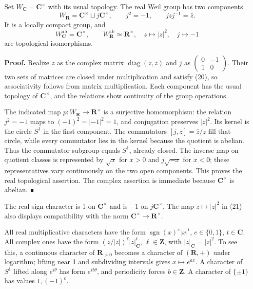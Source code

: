 \documentclass[11pt,a4paper]{article}
\begin{document}
Set \(W_{\mathbf C}=\mathbf C^\times\) with its usual topology. The real
Weil group has two components \[
W_{\mathbf R}=\mathbf C^\times\sqcup j\mathbf C^\times,\qquad
j^2=-1,\qquad jzj^{-1}=\bar z.
\tag{20}
\] It is a locally compact group, and \[
W_{\mathbf C}^{\mathrm{ab}}=\mathbf C^\times,\qquad
W_{\mathbf R}^{\mathrm{ab}}\simeq\mathbf R^\times,
\quad z\longmapsto|z|^2,\quad j\longmapsto-1
\tag{21}
\] are topological isomorphisms.

\textbf{Proof.} Realize \(z\) as the complex matrix
\(\operatorname{diag}(z,\bar z)\) and \(j\) as
\(\left(\begin{smallmatrix}0&-1\\1&0\end{smallmatrix}\right)\). Their
two sets of matrices are closed under multiplication and satisfy (20),
so associativity follows from matrix multiplication. Each component has
the usual topology of \(\mathbf C^\times\), and the relations show
continuity of the group operations.

The indicated map \(p:W_{\mathbf R}\to\mathbf R^\times\) is a surjective
homomorphism: the relation \(j^2=-1\) maps to \((-1)^2=|-1|^2=1\), and
conjugation preserves \(|z|^2\). Its kernel is the circle \(S^1\) in the
first component. The commutators \([j,z]=\bar z/z\) fill that circle,
while every commutator lies in the kernel because the quotient is
abelian. Thus the commutator subgroup equals \(S^1\), already closed.
The inverse map on quotient classes is represented by \(\sqrt{x}\) for
\(x>0\) and \(j\sqrt{-x}\) for \(x<0\); these representatives vary
continuously on the two open components. This proves the real
topological assertion. The complex assertion is immediate because
\(\mathbf C^\times\) is abelian. ∎

The real sign character is 1 on \(\mathbf C^\times\) and is \(-1\) on
\(j\mathbf C^\times\). The map \(z\mapsto|z|^2\) in (21) also displays
compatibility with the norm \(\mathbf C^\times\to\mathbf R^\times\).

All real multiplicative characters have the form
\(\operatorname{sgn}(x)^e|x|^t\), \(e\in\{0,1\}\), \(t\in\mathbf C\).
All complex ones have the form \((z/|z|)^\ell|z|_{\mathbf C}^t\),
\(\ell\in\mathbf Z\), with \(|z|_{\mathbf C}=|z|^2\). To see this, a
continuous character of \(\mathbf R_{>0}\) becomes a character of
\((\mathbf R,+)\) under logarithm; lifting near 1 and subdividing
intervals gives \(x\mapsto e^{ax}\). A character of \(S^1\) lifted along
\(e^{i\theta}\) has form \(e^{ib\theta}\), and periodicity forces
\(b\in\mathbf Z\). A character of \(\{\pm1\}\) has values \(1,(-1)^e\).
\end{document}
